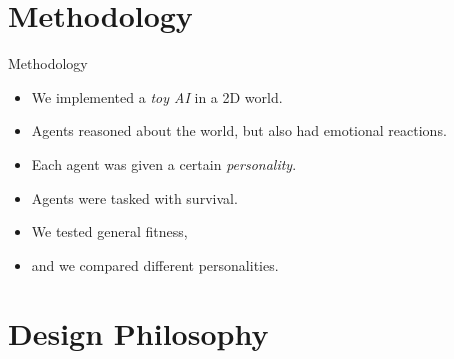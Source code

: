 \documentclass{beamer}
\begin{document}
%      
%      
%      
%

   \section{Methodology}
   
   \begin{frame}{Methodology}
      \begin{itemize}
         \item We implemented a \emph{toy AI} in a 2D world.
         \item Agents reasoned about the world, but also had emotional reactions.
         \item Each agent was given a certain \emph{personality}.
         \item Agents were tasked with survival.
         
         \vspace{1cm}
         \pause
         
         \item We tested general fitness,
         \item and we compared different personalities.
      \end{itemize}
   \end{frame}
   
   \section{Design Philosophy}
   
\end{document}
